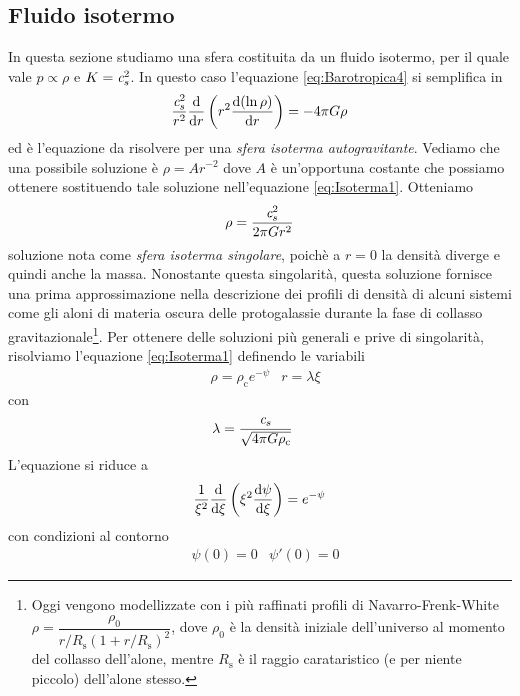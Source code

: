 \subsection{Fluido isotermo}
In questa sezione studiamo una sfera costituita da un fluido isotermo, per il quale vale $p\propto \rho$ e $K=\textit{c}_{s}^2$. In questo caso l'equazione \ref{eq:Barotropica4} si semplifica in
\begin{equation}
\frac{\textit{c}_{s}^2}{r^2}\dfrac{\mathrm{d} {}}{\mathrm{d} {r}} \left( r^2 \dfrac{\mathrm{d} {(\ln\rho)}}{\mathrm{d} {r}} \right) = -4\pi G \rho \label{eq:Isoterma1}
\end{equation}
ed è l'equazione da risolvere per una \textit{sfera isoterma autogravitante}. Vediamo che una possibile soluzione è $\rho = A r^{-2}$ dove $A$ è un'opportuna costante che possiamo ottenere sostituendo tale soluzione nell'equazione \ref{eq:Isoterma1}. Otteniamo 
\begin{equation}
\rho = \frac{\textit{c}_{s}^2}{2\pi G r^2}
\end{equation}
soluzione nota come \textit{sfera isoterma singolare}, poichè a $r=0$ la densità diverge e quindi anche la massa. Nonostante questa singolarità, questa soluzione fornisce una prima approssimazione nella descrizione dei profili di densità di alcuni sistemi come gli aloni di materia oscura delle protogalassie durante la fase di collasso gravitazionale\footnote{Oggi vengono modellizzate con i più raffinati profili di Navarro-Frenk-White $\rho = \dfrac{\rho_0}{r/R_\mathrm{s} \left( 1+ r/R_\mathrm{s} \right)^2}$, dove $\rho_0$ è la densità iniziale dell'universo al momento del collasso dell'alone, mentre $R_\mathrm{s}$ è il raggio carataristico (e per niente piccolo) dell'alone stesso.}. Per ottenere delle soluzioni più generali e prive di singolarità, risolviamo l'equazione \ref{eq:Isoterma1} definendo le variabili
\begin{align}
&\rho = \rho_\mathrm{c} e^{-\psi} 
&r=\lambda \xi
\end{align}
con
\begin{align}
&\lambda=\frac{\textit{c}_{s}}{\sqrt{4\pi G \rho_\mathrm{c}}}
\end{align}
L'equazione si riduce a 
\begin{equation}
\frac{1}{\xi^2} \dfrac{\mathrm{d} {}}{\mathrm{d} {\xi}} \left( \xi^2 \dfrac{\mathrm{d} {\psi}}{\mathrm{d} {\xi}} \right) = e^{-\psi} \label{eq:Isoterma2}
\end{equation}
con condizioni al contorno
\begin{align*}
&\psi(0) =0 
&\psi'(0) =0
\end{align*}


